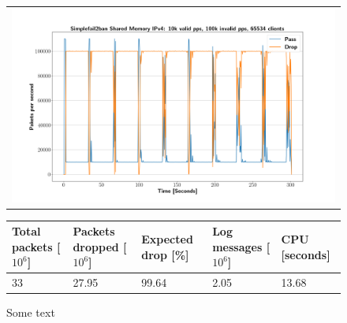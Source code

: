 \begin{figure}[p]
	\label{fig:simplefail2ban:shm:ip4:100k}
	\centering
	\scriptsize
	\begin{tabular}{c}
    	\centerline{\includegraphics[width=1.2\textwidth]{images/simplefail2ban_shm_ipv4_v10k_iv100k_c65534.png}}
	\end{tabular}
	\begin{tabular}{lllll}
		\toprule
		\textbf{Total packets [$10^6$]} & \textbf{Packets dropped [$10^6$]} & \textbf{Expected drop [\%]} & \textbf{Log messages [$10^6$]} & \textbf{CPU [seconds]} \\ \midrule 
		33 & 27.95 & 99.64 & 2.05 & 13.68 \\
		\bottomrule
	\end{tabular}
	\caption[Simplefail2ban Shared Memory IPv4 1m PPS]{Some text}
\end{figure}

